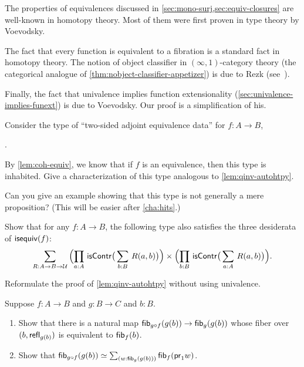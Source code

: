 The properties of equivalences discussed in \autoref{sec:mono-surj,sec:equiv-closures} are well-known in homotopy theory.
Most of them were first proven in type theory by Voevodsky.

The fact that every function is equivalent to a fibration is a standard fact in homotopy theory.
The notion of object classifier in $(\infty,1)$-category theory (the categorical analogue of \autoref{thm:nobject-classifier-appetizer}) is due to Rezk (see~\cite{Rezk05,lurie:higher-topoi}).

Finally, the fact that univalence implies function extensionality (\autoref{sec:univalence-implies-funext}) is due to Voevodsky.
Our proof is a simplification of his.

\sectionExercises

\begin{ex}
  Consider the type of ``two-sided adjoint equivalence data'' for $f:A\to B$,
  \begin{narrowmultline*}
    \narrowbreak
     \times
    .
  \end{narrowmultline*}
  By \autoref{lem:coh-equiv}, we know that if $f$ is an equivalence, then this type is inhabited.
  Give a characterization of this type analogous to \autoref{lem:qinv-autohtpy}.

  Can you give an example showing that this type is not generally a mere proposition?
  (This will be easier after \autoref{cha:hits}.)
\end{ex}

\begin{ex}
  Show that for any $f:A\to B$, the following type also satisfies the three desiderata of $\mathsf{isequiv}(f)$:
  \begin{equation*}
    \sm{R:A\to B\to \type}
    \Parens{\prd{a:A} \iscontr\big(\sm{b:B} R(a,b)\big)} \times
    \Parens{\prd{b:B} \iscontr\big(\sm{a:A} R(a,b)\big)}.
  \end{equation*}
\end{ex}

\begin{ex} \label{ex:qinv-autohtpy-no-univalence}
  Reformulate the proof of \autoref{lem:qinv-autohtpy} without using univalence.
\end{ex}

\begin{ex}\label{ex:unstable-octahedron}
  Suppose $f:A\to B$ and $g:B\to C$ and $b:B$.
  \begin{enumerate}
  \item Show that there is a natural map ${\mathsf{fib}}_{g\circ f}(g(b)) \to {\mathsf{fib}}_{g}(g(b))$ whose fiber over $(b,\mathsf{refl}_{g(b)})$ is equivalent to ${\mathsf{fib}}_{f}(b)$.
  \item Show that $\eqv{\hfib{g\circ f}{g(b)}}{\sm{w:\hfib{g}{g(b)}} \hfib f {\proj1 w}}$.
  \end{enumerate}
\end{ex}

